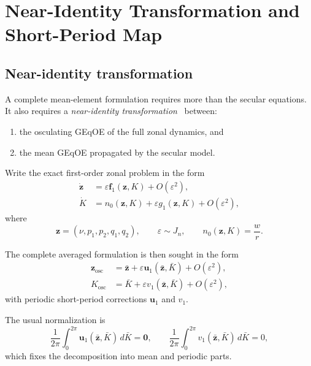 \documentclass[11pt]{article}
\begin{document}
\section{Near-Identity Transformation and Short-Period Map}
\label{sec:near_identity}

\subsection{Near-identity transformation}

A complete mean-element formulation requires more than the secular equations.
It also requires a \emph{near-identity
transformation}~\cite{deprit1969,hori1966} between:
\begin{enumerate}
    \item the osculating GEqOE of the full zonal dynamics, and
    \item the mean GEqOE propagated by the secular model.
\end{enumerate}

Write the exact first-order zonal problem in the form
\begin{align}
\dot{\bm z} &= \varepsilon \bm f_1(\bm z,K) + O(\varepsilon^2), \\
\dot K &= n_0(\bm z,K) + \varepsilon g_1(\bm z,K) + O(\varepsilon^2),
\label{eq:j2_fast_slow_form}
\end{align}
where
\begin{equation}
\bm z = (\nu,p_1,p_2,q_1,q_2),
\qquad
\varepsilon \sim J_n,
\qquad
n_0(\bm z,K) = \frac{w}{r}.
\end{equation}

The complete averaged formulation is then sought in the form
\begin{align}
\bm z_{\mathrm{osc}}
&= \bar{\bm z}
+ \varepsilon \bm u_1(\bar{\bm z},\bar K)
+ O(\varepsilon^2), \label{eq:forward_map_z}\\
K_{\mathrm{osc}}
&= \bar K
+ \varepsilon v_1(\bar{\bm z},\bar K)
+ O(\varepsilon^2), \label{eq:forward_map_K}
\end{align}
with periodic short-period corrections $\bm u_1$ and $v_1$.

The usual normalization is
\begin{equation}
\frac{1}{2\pi}\int_0^{2\pi} \bm u_1(\bar{\bm z},\bar K)\,d\bar K = \bm 0,
\qquad
\frac{1}{2\pi}\int_0^{2\pi} v_1(\bar{\bm z},\bar K)\,d\bar K = 0,
\label{eq:zero_mean_norm}
\end{equation}
which fixes the decomposition into mean and periodic parts.
\end{document}
